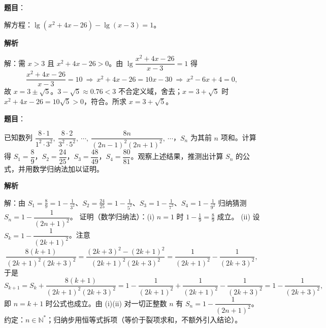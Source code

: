 \begin{answer}

\textbf{题目}：

解方程：$\lg(x^2+4x-26)-\lg(x-3)=1$。

\textbf{解析}

解：需 $x>3$ 且 $x^2+4x-26>0$。由 $\lg\dfrac{x^2+4x-26}{x-3}=1$ 得
\nopagebreak[4]
\[\frac{x^2+4x-26}{x-3}=10\ \Rightarrow\ x^2+4x-26=10x-30\ \Rightarrow\ x^2-6x+4=0,\]
故 $x=3\pm\sqrt5$。$3-\sqrt5\approx0.76<3$ 不合定义域，舍去；$x=3+\sqrt5$ 时 $x^2+4x-26=10\sqrt5>0$，符合。所求 $x=3+\sqrt5$。


\end{answer}
\begin{answer}

\textbf{题目}：

已知数列 $\dfrac{8\cdot1}{1^2\cdot3^2},\ \dfrac{8\cdot2}{3^2\cdot5^2},\ \cdots,\ \dfrac{8n}{(2n-1)^2(2n+1)^2},\ \cdots$，$S_n$ 为其前 $n$ 项和。计算得 $S_1=\dfrac89$，$S_2=\dfrac{24}{25}$，$S_3=\dfrac{48}{49}$，$S_4=\dfrac{80}{81}$。观察上述结果，推测出计算 $S_n$ 的公式，并用数学归纳法加以证明。

\textbf{解析}

解：由 $S_1=\frac89=1-\frac1{3^2}$、$S_2=\frac{24}{25}=1-\frac1{5^2}$、$S_3=1-\frac1{7^2}$、$S_4=1-\frac1{9^2}$ 归纳猜测 $S_n=1-\dfrac1{(2n+1)^2}$。
证明（数学归纳法）：(i) $n=1$ 时 $1-\frac19=\frac89$ 成立。
(ii) 设 $S_k=1-\dfrac1{(2k+1)^2}$。注意
\nopagebreak[4]
\[\frac{8(k+1)}{(2k+1)^2(2k+3)^2}=\frac{(2k+3)^2-(2k+1)^2}{(2k+1)^2(2k+3)^2}=\frac1{(2k+1)^2}-\frac1{(2k+3)^2},\]
于是
\nopagebreak[4]
\[S_{k+1}=S_k+\frac{8(k+1)}{(2k+1)^2(2k+3)^2}=1-\frac1{(2k+1)^2}+\frac1{(2k+1)^2}-\frac1{(2k+3)^2}=1-\frac1{(2k+3)^2},\]
即 $n=k+1$ 时公式也成立。由 (i)(ii) 对一切正整数 $n$ 有 $S_n=1-\dfrac1{(2n+1)^2}$。
约定：$n\in\mathbb N^*$；归纳步用恒等式拆项（等价于裂项求和，不额外引入结论）。


\end{answer}
